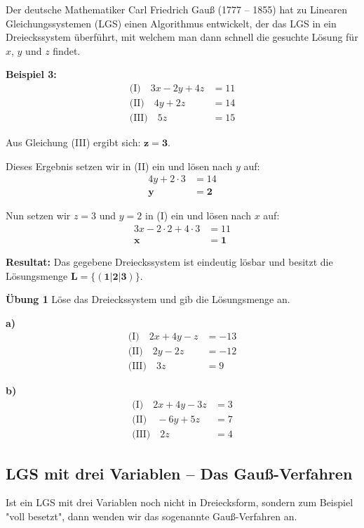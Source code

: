 \documentclass{article}
\begin{document}
Der deutsche Mathematiker Carl Friedrich Gauß (1777 – 1855) hat zu Linearen Gleichungssystemen (LGS) einen Algorithmus entwickelt, der das LGS in ein Dreieckssystem überführt, mit welchem man dann schnell die gesuchte Lösung für $x$, $y$ und $z$ findet.

\textbf{Beispiel 3:}
\begin{align*}
\text{(I)} \quad 3x - 2y + 4z &= 11\\
\text{(II)} \quad 4y + 2z &= 14\\
\text{(III)} \quad 5z &= 15
\end{align*}

Aus Gleichung (III) ergibt sich: $\mathbf{z = 3}$.

Dieses Ergebnis setzen wir in (II) ein und lösen nach $y$ auf:
\begin{align*}
4y + 2 \cdot 3 &= 14\\
\mathbf{y} &= \mathbf{2}
\end{align*}

Nun setzen wir $z = 3$ und $y = 2$ in (I) ein und lösen nach $x$ auf:
\begin{align*}
3x - 2 \cdot 2 + 4 \cdot 3 &= 11\\
\mathbf{x} &= \mathbf{1}
\end{align*}

\textbf{Resultat:} Das gegebene Dreieckssystem ist eindeutig lösbar und besitzt die Lösungsmenge $\mathbf{L = \{(1|2|3)\}}$.

\textbf{Übung 1} Löse das Dreieckssystem und gib die Lösungsmenge an.

\textbf{a)}
\begin{align*}
\text{(I)} \quad 2x + 4y - z &= -13\\
\text{(II)} \quad 2y - 2z &= -12\\
\text{(III)} \quad 3z &= 9
\end{align*}

\textbf{b)}
\begin{align*}
\text{(I)} \quad 2x + 4y - 3z &= 3\\
\text{(II)} \quad -6y + 5z &= 7\\
\text{(III)} \quad 2z &= 4
\end{align*}

\subsection{LGS mit drei Variablen – Das Gauß-Verfahren}

Ist ein LGS mit drei Variablen noch nicht in Dreiecksform, sondern zum Beispiel "voll besetzt", dann wenden wir das sogenannte Gauß-Verfahren an.
\end{document}
